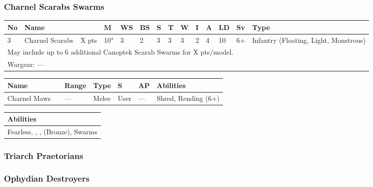 \subsubsection{Charnel Scarabs Swarms}

\noindent
\begin{tabular}{||m{10pt} m{95pt} m{30pt} m{11pt} m{11pt} m{11pt} m{11pt} m{11pt} m{11pt} m{11pt} m{11pt} m{11pt} m{11pt} m{125pt}||}
	\hline
	No & Name & & M & WS & BS & S & T & W & I & A & LD & Sv & Type \\
	\hline
	3 & Charnel Scarabs & X pts & 10" & 3 & 2 & 3 & 3 & 3 & 2 & 4 & 10 & 6+ & Infantry (Floating, Light, Monstrous)\\
	\hline
	\hline
	\multicolumn{14}{||Z{532 pt}||}{May include up to 6 additional Canoptek Scarab Swarms for X pts/model.}\\		
	\hline
	\hline
	\multicolumn{14}{||Z{532 pt}||}{Wargear: —}\\
	\hline
\end{tabular}

\noindent
\begin{tabular}{||m{110pt} m{30pt} m{31pt} m{55pt} m{12pt} m{12pt} m{210pt}||}
	\hline
	Name & & Range & Type & S & AP & Abilities \\
	\hline
	Charnel Maws & & — & Melee & User & — & Shred, Rending (6+) \\
	\hline
\end{tabular}

\noindent
\begin{tabular}{||m{532pt}||}
	\hline
	Abilities \\
	\hline
	Fearless, \quickref{Living Metal}, \quickref{Reanimation Protocols}, \quickref{Soulless Hordes} (Bronze), Swarms \\
	\hline
\end{tabular}



\newpage
\subsubsection{Triarch Praetorians}


\newpage
\subsubsection{Ophydian Destroyers}
 
